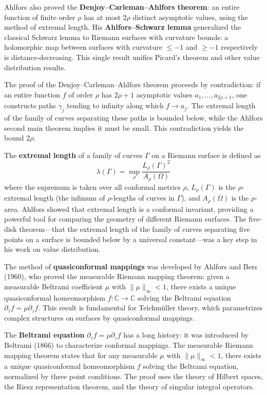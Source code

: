 Ahlfors also proved the \textbf{Denjoy--Carleman--Ahlfors theorem}: an entire function of finite order $\rho$ has at most $2\rho$ distinct asymptotic values, using the method of extremal length. His \textbf{Ahlfors--Schwarz lemma} generalized the classical Schwarz lemma to Riemann surfaces with curvature bounds: a holomorphic map between surfaces with curvature $\leq -1$ and $\geq -1$ respectively is distance-decreasing. This single result unifies Picard's theorem and other value distribution results.

The proof of the Denjoy--Carleman--Ahlfors theorem proceeds by contradiction: if an entire function $f$ of order $\rho$ has $2\rho + 1$ asymptotic values $a_1, \ldots, a_{2\rho+1}$, one constructs paths $\gamma_j$ tending to infinity along which $f \to a_j$. The extremal length of the family of curves separating these paths is bounded below, while the Ahlfors second main theorem implies it must be small. This contradiction yields the bound $2\rho$.

The \textbf{extremal length} of a family of curves $\Gamma$ on a Riemann surface is defined as
\[\lambda(\Gamma) = \sup_{\rho} \frac{L_\rho(\Gamma)^2}{A_\rho(\Omega)}\]
where the supremum is taken over all conformal metrics $\rho$, $L_\rho(\Gamma)$ is the $\rho$-extremal length (the infimum of $\rho$-lengths of curves in $\Gamma$), and $A_\rho(\Omega)$ is the $\rho$-area. Ahlfors showed that extremal length is a conformal invariant, providing a powerful tool for comparing the geometry of different Riemann surfaces. The five-disk theorem---that the extremal length of the family of curves separating five points on a surface is bounded below by a universal constant---was a key step in his work on value distribution.

The method of \textbf{quasiconformal mappings} was developed by Ahlfors and Bers (1960), who proved the measurable Riemann mapping theorem: given a measurable Beltrami coefficient $\mu$ with $\|\mu\|_\infty < 1$, there exists a unique quasiconformal homeomorphism $f: \mathbb{C} \to \mathbb{C}$ solving the Beltrami equation $\partial_{\bar{z}} f = \mu \partial_z f$. This result is fundamental for Teichm\"{u}ller theory, which parametrizes complex structures on surfaces by quasiconformal mappings.

The \textbf{Beltrami equation} $\partial_{\bar{z}} f = \mu \partial_z f$ has a long history: it was introduced by Beltrami (1866) to characterize conformal mappings. The measurable Riemann mapping theorem states that for any measurable $\mu$ with $\|\mu\|_\infty < 1$, there exists a unique quasiconformal homeomorphism $f$ solving the Beltrami equation, normalized by three point conditions. The proof uses the theory of Hilbert spaces, the Riesz representation theorem, and the theory of singular integral operators.

